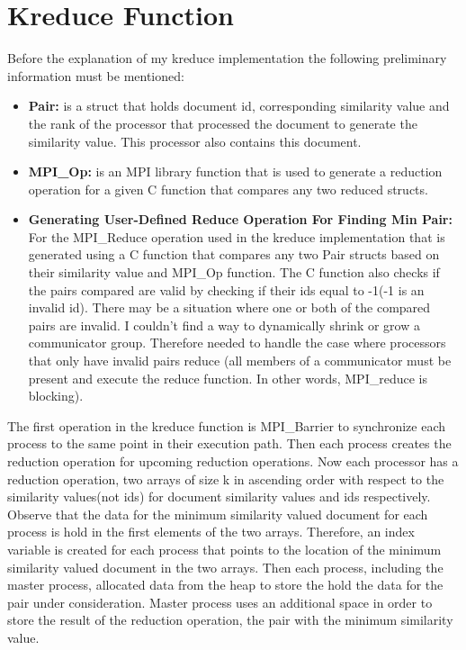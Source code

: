 \documentclass{article}
\begin{document}
\section{Kreduce Function}
\qquad Before the explanation of my kreduce implementation the following preliminary information must be mentioned:
\begin{itemize}
    \item \textbf{Pair:} is a struct that holds document id, corresponding similarity value and the rank of the processor that processed the document to generate the similarity value. This processor also contains this document. 
    \item \textbf{MPI\_Op:} is an MPI library function that is used to generate a reduction operation for a given C function that compares any two reduced structs.
    \item \textbf{Generating User-Defined Reduce Operation For Finding Min Pair:} For the MPI\_Reduce operation used in the kreduce implementation that is generated using a C function that compares any two Pair structs based on their similarity value and MPI\_Op function. The C function also checks if the pairs compared are valid by checking if their ids equal to -1(-1 is an invalid id). There may be a situation where one or both of the compared pairs are invalid. I couldn't find a way to dynamically shrink or grow a communicator group. Therefore needed to handle the case where processors that only have invalid pairs reduce (all members of a communicator must be present and execute the reduce function. In other words, MPI\_reduce is blocking).
\end{itemize}
\null \qquad The first operation in the kreduce function is MPI\_Barrier to synchronize each process to the same point in their execution path. Then each process creates the reduction operation for upcoming reduction operations. Now each processor has a reduction operation, two arrays of size k in ascending order with respect to the similarity values(not ids) for document similarity values and ids respectively. Observe that the data for the minimum similarity valued document for each process is hold in the  first elements of the two arrays. Therefore, an index variable is created for each process that points to the location of the minimum similarity valued document in the two arrays. Then each process, including the master process, allocated data from the heap to store the hold the data for the pair under consideration. Master process uses an additional space in order to store the result of the reduction operation, the pair with the minimum similarity value. \\
\end{document}
